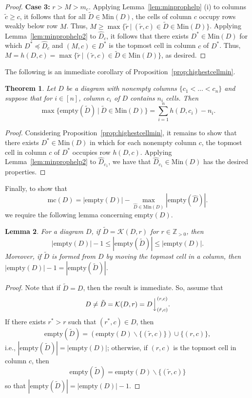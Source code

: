 \documentclass[letterpaper,10pt]{article}
\newcommand{\ldownarrow}{\Big\downarrow}
\newtheorem{theorem}{Theorem}[section]
\newtheorem{lemma}[theorem]{Lemma}
\begin{document}
\begin{proof}
    \noindent
    \textbf{Case 3:} $r>M>m_c$. Applying Lemma~\ref{lem:minprophelp} (i) to columns $\tilde{c}\ge c$, it follows that for all $\tilde{D}\in\mathrm{Min}(D)$, the cells of column $c$ occupy rows weakly below row $M$. Thus, $M\ge\max\{\tilde{r}~|~(\tilde{r},c)\in \tilde{D}\in\mathrm{Min}(D)\}$. Applying Lemma~\ref{lem:minprophelp2} to $\widehat{D}_c$, it follows that there exists $D^*\in\mathrm{Min}(D)$ for which $D^*\preceq \widehat{D}_c$ and $(M,c)\in D^*$ is the topmost cell in column $c$ of $D^*$. Thus, $M=h(D,c)=\max\{\tilde{r}~|~(\tilde{r},c)\in \tilde{D}\in\mathrm{Min}(D)\}$, as desired.
\end{proof}

 The following is an immediate corollary of Proposition~\ref{prop:highestcellmin}.

\begin{theorem}\label{thm:maxmin}
    Let $D$ be a diagram with nonempty columns $\{c_1<\hdots<c_n\}$ and suppose that for $i\in [n]$, column $c_i$ of $D$ contains $n_i$ cells. Then $$\max\{\mathrm{empty}(\tilde{D})~|~\tilde{D}\in\mathrm{Min}(D)\}=\sum_{i=1}^nh(D,c_i)-n_i.$$
\end{theorem}
\begin{proof}
    Considering Proposition~\ref{prop:highestcellmin}, it remains to show that there exists $D^*\in\mathrm{Min}(D)$ in which for each nonempty column $c$, the topmost cell in column $c$ of $D^*$ occupies row $h(D,c)$. Applying Lemma~\ref{lem:minprophelp2} to $\widehat{D}_{c_1}$, we have that $\widehat{D}_{c_1}\in\mathrm{Min}(D)$ has the desired properties.
\end{proof}

Finally, to show that 
\begin{equation*}
    \mathrm{mc}(D)=|\mathrm{empty}(D)|-\max_{\widehat{D}\in\mathrm{Min}(D)}|\mathrm{empty}(\widehat{D})|.
\end{equation*} 
we require the following lemma concerning $\mathrm{empty}(D)$.

\begin{lemma}\label{lem:empty}
    For a diagram $D$, if $\tilde{D}=\mathcal{K}(D,r)$ for $r\in\mathbb{Z}_{>0}$, then $$|\mathrm{empty}(D)|-1\le |\mathrm{empty}(\tilde{D})|\le|\mathrm{empty}(D)|.$$ Moreover, if $\tilde{D}$ is formed from $D$ by moving the topmost cell in a column, then $|\mathrm{empty}(D)| - 1 = |\mathrm{empty}(\tilde{D})|$.
\end{lemma}
\begin{proof}
    Note that if $\tilde{D}=D$, then the result is immediate. So, assume that $$D\neq \tilde{D}=\mathcal{K}(D,r)=D\ldownarrow^{(r,c)}_{(\tilde{r},c)}.$$ If there exists $r^*>r$ such that $(r^*,c)\in D$, then $$\mathrm{empty}(\tilde{D})=(\mathrm{empty}(D)\backslash \{(\tilde{r},c)\})\cup\{(r,c)\},$$ i.e., $|\mathrm{empty}(\tilde{D})|=|\mathrm{empty}(D)|$; otherwise, if $(r, c)$ is the topmost cell in column $c$, then $$\mathrm{empty}(\tilde{D})=\mathrm{empty}(D)\backslash \{(\tilde{r},c)\}$$ so that $|\mathrm{empty}(\tilde{D})|=|\mathrm{empty}(D)|-1$. 
\end{proof}
\end{document}
